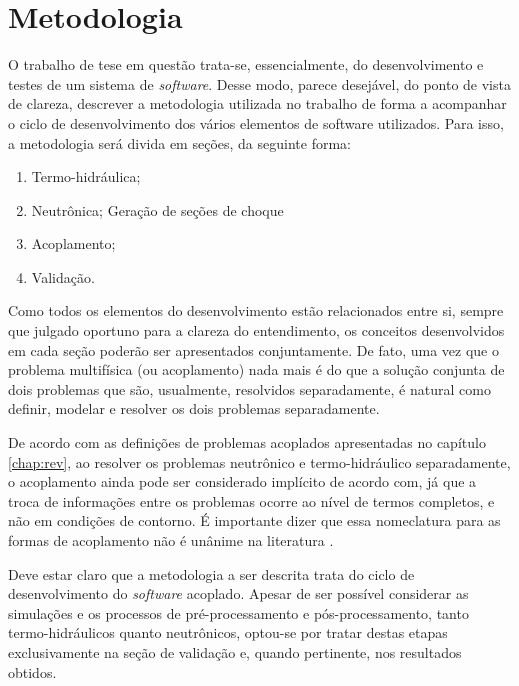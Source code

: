 \chapter{Metodologia}
\label{chap:metodologia}

O trabalho de tese em questão trata-se, essencialmente, do desenvolvimento e testes
de um sistema de \textit{software}. Desse modo, parece desejável, do ponto de vista de
clareza, descrever a metodologia utilizada no trabalho de forma a acompanhar o ciclo
de desenvolvimento dos vários elementos de software utilizados. Para isso, a metodologia
será divida em seções, da seguinte forma:
\begin{enumerate}
\item Termo-hidráulica;
\item Neutrônica;
  \subitem Geração de seções de choque
\item Acoplamento;
\item Validação.
\end{enumerate}

Como todos os elementos do desenvolvimento estão relacionados entre si, sempre que
julgado oportuno para a clareza do entendimento, os conceitos desenvolvidos em cada
seção poderão ser apresentados conjuntamente. De fato, uma vez que o problema multifísica
(ou acoplamento) nada mais é do que a solução conjunta de dois problemas que são,
usualmente, resolvidos separadamente, é natural como definir, modelar e resolver os
dois problemas separadamente.

De acordo com as definições de problemas acoplados apresentadas
no capítulo \ref{chap:rev}, ao resolver os problemas neutrônico e termo-hidráulico
separadamente, o acoplamento ainda pode ser considerado implícito de acordo com, já que a troca de informações entre os problemas ocorre ao nível de termos completos,
e não em condições de contorno. É importante dizer que essa nomeclatura para as formas
de acoplamento não é unânime na literatura \cite{Ivanov2007}.

Deve estar claro que a metodologia a ser descrita trata do ciclo de desenvolvimento
do \textit{software} acoplado. Apesar de ser possível considerar as simulações e
os processos de pré-processamento e pós-processamento, tanto termo-hidráulicos quanto
neutrônicos, optou-se por tratar destas etapas exclusivamente na seção de validação e,
quando pertinente, nos resultados obtidos.

